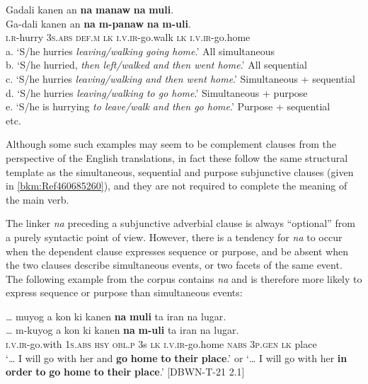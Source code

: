\ea
\label{bkm:Ref474392546}
Gadali  kanen  an  \textbf{na}  \textbf{manaw}  \textbf{na}  \textbf{muli}. \smallskip\\
\gll Ga-dali  kanen  an  \textbf{na}  \textbf{m-panaw}  \textbf{na}  \textbf{m-uli}. \\
\textsc{i.r}-hurry  3\textsc{s.abs}  \textsc{def.m}  \textsc{lk}  \textsc{i.v.ir}-go.walk  \textsc{lk}  \textsc{i.v.ir}-go.home \\
\glt
a. ‘S/he hurries \textit{leaving/walking going home}.’ All simultaneous \\
b. ‘S/he hurried, \textit{then left/walked and then went home}.’ All sequential \\
c. ‘S/he hurries \textit{leaving/walking and then went home}.’ Simultaneous + sequential \\
d. ‘S/he hurries \textit{leaving/walking to go home}.’ Simultaneous + purpose \\
e. ‘S/he is hurrying \textit{to leave/walk and then go home}.’ Purpose + sequential \\
etc.
\z

Although some such examples may seem to be complement clauses from the perspective of the English translations, in fact these follow the same structural template as the simultaneous, sequential and purpose subjunctive clauses (given in \ref{bkm:Ref460685260}), and they are not required to complete the meaning of the main verb.

The linker \textit{na} preceding a subjunctive adverbial clause is always “optional” from a purely syntactic point of view. However, there is a tendency for \textit{na} to occur when the dependent clause expresses sequence or purpose, and be absent when the two clauses describe simultaneous events, or two facets of the same event. The following example from the corpus contains \textit{na} and is therefore more likely to express sequence or purpose than simultaneous events:

\ea
… muyog  a  kon  ki  kanen  \textbf{na}  \textbf{muli}  ta  iran  na  lugar. \smallskip\\
\gll … m-kuyog  a  kon  ki  kanen  \textbf{na}  \textbf{m-uli}  ta  iran  na  lugar. \\
{} \textsc{i.v.ir}-go.with  1\textsc{s.abs}  \textsc{hsy}  \textsc{obl.p}  3s  \textsc{lk}  \textsc{i.v.ir}-go.home  \textsc{nabs}  3\textsc{p.gen}  \textsc{lk}  place \\
\glt ‘… I will go with her and \textbf{go} \textbf{home} \textbf{to} \textbf{their} \textbf{place}.’ or ‘… I will go with her \textbf{in} \textbf{order}  \textbf{to} \textbf{go} \textbf{home} \textbf{to} \textbf{their} \textbf{place}.’ [DBWN-T-21 2.1]
\z


